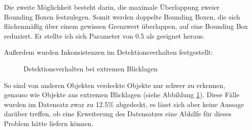 Die zweite Möglichkeit besteht darin, die maximale Überlappung zweier Bounding Boxen festzulegen. Somit werden doppelte Bounding Boxen, die sich flächenmäßig über einem gewissen Grenzwert überlappen, auf eine Bounding Box reduziert. Er stellte ich sich Parameter von 0.5 als geeignet heraus.

Außerdem wurden Inkonsistenzen im Detektionsverhalten festgestellt:

\begin{figure}[ht]
	\centering
	\hspace{2cm}
	\caption{Detektionsverhalten bei extremen Blicklagen}
	\label{lagen}
\end{figure}

So sind von anderen Objekten verdeckte Objekte nur schwer zu erkennen, genauso wie Objekte aus extremen Blicklagen (siehe Abbildung \ref{lagen}). Diese Fälle wurden im Datensatz zwar zu 12.5\% abgedeckt, es lässt sich aber keine Aussage darüber treffen, ob eine Erweiterung des Datensatzes eine Abhilfe für dieses Problem hätte liefern können. 

